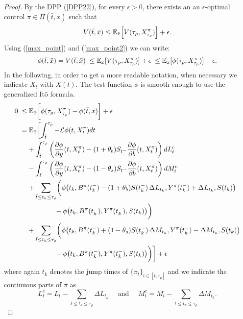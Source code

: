 \begin{proof}
By the DPP (\ref{DPP22}), for every $\epsilon > 0$, there exists an an $\epsilon$-optimal control $\pi \in \Pi(\bar t,\bar x)$ such that
\begin{equation}
  V(\bar t, \bar x) \leq \mathbb{E}_{\bar x} \Bigl[ V(\tau_{\rho}, X^{\pi}_{\tau_{\rho}}) \Bigr] +\epsilon.
\end{equation}
Using (\ref{max_point}) and (\ref{max_point2}) we can write:
\begin{equation*}
 \phi(\bar t, \bar x) = V(\bar t, \bar x) \; \leq \mathbb{E}_{\bar x}[V(\tau_{\rho}, X^{\pi}_{\tau_{\rho}})] + \epsilon \; 
 \leq \mathbb{E}_{\bar x}[\phi(\tau_{\rho}, X^{\pi}_{\tau_{\rho}})] + \epsilon.
\end{equation*}
In the following, in order to get a more readable notation, when necessary we indicate $X_t$ with $X(t)$.
The test function $\phi$ is smooth enough to use the generalized It\=o formula.
\begin{align}\label{first_inequality}
 0 \; \leq & \; \mathbb{E}_{\bar x} \biggl[ \phi(\tau_{\rho}, X^{\pi}_{\tau_{\rho}}) - \phi(\bar t, \bar x) \biggr] + \epsilon \\ \nonumber
    = & \; \mathbb{E}_{\bar x} \biggl[ \int_{\bar t}^{\tau_{\rho}} -\mathcal{L} \phi(t,X^{\pi}_t) dt \\ \nonumber
    & + \int_{\bar t}^{\tau_{\rho}} \left(\frac{\partial \phi}{\partial y}(t, X^{\pi}_t) -(1+\theta_b) S_{t^-} \frac{\partial \phi}{\partial b}( t, X^{\pi}_t)\right) dL^c_t \\ \nonumber
    & - \int_{\bar t}^{\tau_{\rho}} \left(\frac{\partial \phi}{\partial y}( t, X^{\pi}_t)-(1-\theta_s) S_{t^-} \frac{\partial \phi}{\partial b}( t, X^{\pi}_t)\right) dM^c_t \\ \nonumber
    & + \sum_{\bar t \leq t_k \leq \tau_{\rho}} \biggl( \phi \bigl( t_k, B^{\pi}(t_k^-) - (1+\theta_b) S(t_k^-)\, \Delta L_{t_k}, Y^{\pi}(t_k^-) + \Delta L_{t_k}, S(t_k) \bigr) \\ \nonumber 
    & \hspace{4em} - \phi \bigl(t_k, B^{\pi}(t_k^-), Y^{\pi}(t_k^-), S(t_k) \bigr) \biggr) \\ \nonumber
    & + \sum_{\bar t \leq t_k \leq \tau_{\rho}} \biggl( \phi \bigl( t_k, B^{\pi}(t_k^-) + (1-\theta_s) S(t_k^-)\, \Delta M_{t_k}, Y^{\pi}(t_k^-) - \Delta M_{t_k}, S(t_k) \bigr) \\ \nonumber
    & \hspace{4em} - \phi \bigl(t_k, B^{\pi}(t_k^-), Y^{\pi}(t_k^-), S(t_k) \bigr) \biggr) \biggr] + \epsilon
\end{align}
where again $t_k$ denotes the jump times of $\{\pi_t\}_{t \in [\bar t, \tau_{\rho}]}$ and we indicate the continuous parts of $\pi$ as
\begin{equation}
 L^c_t = L_t - \sum_{\bar t \leq t_k \leq \tau_{\rho}} \Delta L_{t_k} \quad \mbox{ and } \quad  M^c_t = M_t - \sum_{\bar t \leq t_k \leq \tau_{\rho}} \Delta M_{t_k}.
\end{equation}


\end{proof}
